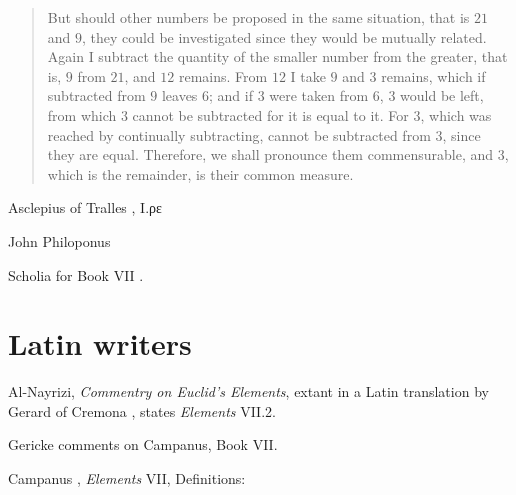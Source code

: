 \documentclass{article}
\begin{document}
\begin{quote}
But should other numbers be proposed in the same situation, that is $21$ and $9$, they could be investigated since they would be mutually related.
Again I subtract the quantity of the smaller number from the greater, that is, $9$ from $21$, and $12$ remains. From $12$ I take $9$ and $3$ remains, which if subtracted
from $9$ leaves $6$; and if $3$ were taken from $6$, $3$ would be left, from which $3$ cannot be subtracted for it is equal to it. For $3$, which was reached
by continually subtracting, cannot be subtracted from $3$, since they are equal. Therefore, we shall pronounce them commensurable, and $3$, which is the remainder,
is their common measure.
\end{quote}

Asclepius of Tralles \cite[pp.~44, 78]{taran}, I.ρε

John Philoponus \cite{philoponus}


Scholia for Book VII \cite{euclidisV}.




\section{Latin writers}
Al-Nayrizi, {\em Commentry on Euclid's Elements}, extant in a Latin translation by Gerard of Cremona \cite[pp.~190--191]{anaritius}, states
{\em Elements} VII.2.

Gericke \cite[p.~105]{gericke} comments on Campanus, Book VII.

Campanus \cite[pp.~230--231]{campanusI}, {\em Elements} VII, Definitions:
\end{document}
